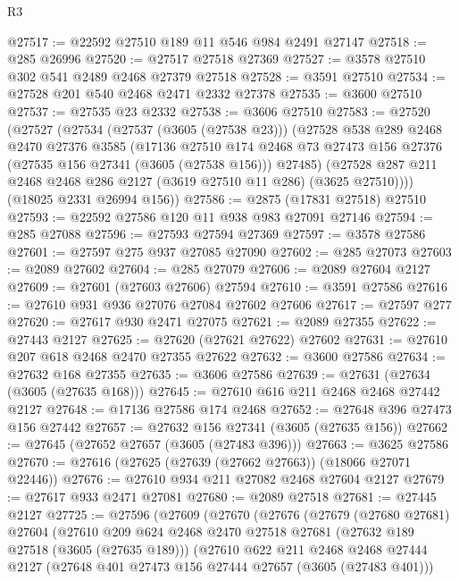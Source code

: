 \begin{lexlean}{R3}
\begin{coremodule}
@27517 := @22592 @27510 @189 @11 @546 @984 @2491 @27147
@27518 := @285 @26996
@27520 := @27517 @27518 @27369
@27527 := @3578 @27510 @302 @541 @2489 @2468 @27379 @27518
@27528 := @3591 @27510
@27534 := @27528 @201 @540 @2468 @2471 @2332 @27378
@27535 := @3600 @27510
@27537 := @27535 @23 @2332
@27538 := @3606 @27510
@27583 := @27520
    (@27527
      (@27534
        (@27537 (@3605 (@27538 @23)))
        (@27528
          @538
          @289
          @2468
          @2470
          @27376
          @3585
          (@17136
            @27510
            @174
            @2468
            @73
            @27473
            @156
            @27376
            (@27535 @156 @27341 (@3605 (@27538 @156)))
            @27485)
          (@27528 @287 @211 @2468 @2468 @286 @2127 (@3619 @27510 @11 @286) (@3625 @27510))))
      (@18025 @2331 @26994 @156))
@27586 := @2875 (@17831 @27518) @27510
@27593 := @22592 @27586 @120 @11 @938 @983 @27091 @27146
@27594 := @285 @27088
@27596 := @27593 @27594 @27369
@27597 := @3578 @27586
@27601 := @27597 @275 @937 @27085 @27090
@27602 := @285 @27073
@27603 := @2089 @27602
@27604 := @285 @27079
@27606 := @2089 @27604 @2127
@27609 := @27601 (@27603 @27606) @27594
@27610 := @3591 @27586
@27616 := @27610 @931 @936 @27076 @27084 @27602 @27606
@27617 := @27597 @277
@27620 := @27617 @930 @2471 @27075
@27621 := @2089 @27355
@27622 := @27443 @2127
@27625 := @27620 (@27621 @27622) @27602
@27631 := @27610 @207 @618 @2468 @2470 @27355 @27622
@27632 := @3600 @27586
@27634 := @27632 @168 @27355
@27635 := @3606 @27586
@27639 := @27631 (@27634 (@3605 (@27635 @168)))
@27645 := @27610 @616 @211 @2468 @2468 @27442 @2127
@27648 := @17136 @27586 @174 @2468
@27652 := @27648 @396 @27473 @156 @27442
@27657 := @27632 @156 @27341 (@3605 (@27635 @156))
@27662 := @27645 (@27652 @27657 (@3605 (@27483 @396)))
@27663 := @3625 @27586
@27670 := @27616 (@27625 (@27639 (@27662 @27663)) (@18066 @27071 @22446))
@27676 := @27610 @934 @211 @27082 @2468 @27604 @2127
@27679 := @27617 @933 @2471 @27081
@27680 := @2089 @27518
@27681 := @27445 @2127
@27725 := @27596
    (@27609
      (@27670
        (@27676
          (@27679
            (@27680 @27681)
            @27604
            (@27610
              @209
              @624
              @2468
              @2470
              @27518
              @27681
              (@27632 @189 @27518 (@3605 (@27635 @189)))
              (@27610
                @622
                @211
                @2468
                @2468
                @27444
                @2127
                (@27648 @401 @27473 @156 @27444 @27657 (@3605 (@27483 @401)))

\end{coremodule}
\end{lexlean}
